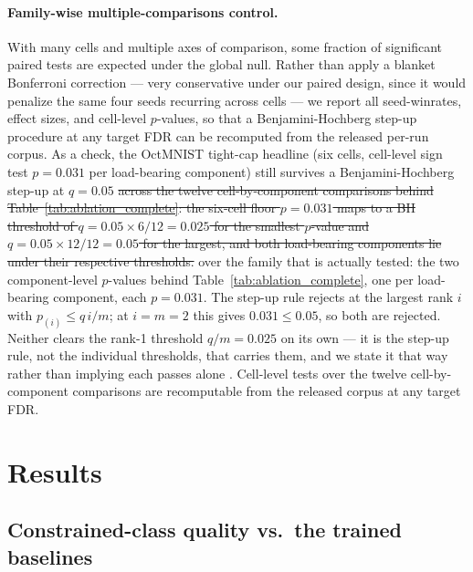 \documentclass[10pt]{article}
\newcommand{\del}[1]{{\color{red}\sout{#1}}}
\begin{document}
\paragraph{Family-wise multiple-comparisons control.}
With many cells and multiple axes of comparison, some fraction of significant
paired tests are expected under the global null. Rather than apply a blanket
Bonferroni correction --- very conservative under our paired design, since it
would penalize the same four seeds recurring across cells --- we report all
seed-winrates, effect sizes, and cell-level $p$-values, so that a
Benjamini-Hochberg step-up procedure at any target FDR can be recomputed from
the released per-run corpus. As a check, the OctMNIST tight-cap headline
(six cells, cell-level sign test $p\!=\!0.031$ per load-bearing component)
still survives a Benjamini-Hochberg step-up at $q\!=\!0.05$
\del{across the twelve
cell-by-component comparisons behind Table~\ref{tab:ablation_complete}: the
six-cell floor $p\!=\!0.031$ maps to a BH threshold of $q\!=\!0.05\times
6/12 = 0.025$ for the smallest $p$-value and $q\!=\!0.05\times 12/12 = 0.05$
for the largest, and both load-bearing components lie under their respective
thresholds.}%
{\color{blue}over the family that is actually tested: the two component-level
$p$-values behind Table~\ref{tab:ablation_complete}, one per load-bearing
component, each $p\!=\!0.031$. The step-up rule rejects at the largest rank $i$
with $p_{(i)}\!\le\!q\,i/m$; at $i\!=\!m\!=\!2$ this gives
$0.031\!\le\!0.05$, so both are rejected. Neither clears the rank-1 threshold
$q/m\!=\!0.025$ on its own --- it is the step-up rule, not the individual
thresholds, that carries them, and we state it that way rather than implying
each passes alone \citep{benjamini1995controlling}. Cell-level tests over the
twelve cell-by-component comparisons are recomputable from the released corpus
at any target FDR.}

\section{Results}
\label{sec:results}

\subsection{Constrained-class quality vs.\ the trained baselines}
\label{sec:oct}
\end{document}
